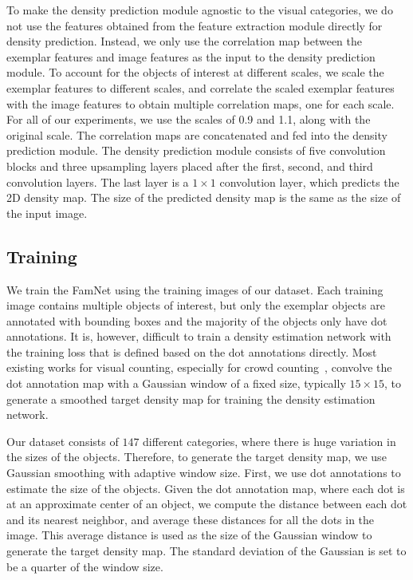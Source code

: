 To make the density prediction module agnostic to the visual categories, we do not use the features obtained from the feature extraction module directly for  density prediction. Instead, we only use the correlation map between the exemplar features and image features as the input to the density prediction module. To account for the objects of interest at different scales, we scale the exemplar features to different scales, and correlate the scaled exemplar features with the image features to obtain multiple correlation maps, one for each scale. For all of our experiments, we use the scales of 0.9 and 1.1, along with the original scale. The correlation maps are concatenated and fed into the density prediction module. The density prediction module consists of five convolution blocks and three upsampling layers placed after the first, second, and third convolution layers. The last layer is a $1{\times}1$ convolution layer, which predicts the 2D density map. The size of the predicted density map is the same as the size of the input image. 

\subsection{Training}

We train the FamNet using the training images of our dataset. Each training image contains multiple objects of interest, but only the exemplar objects are annotated with bounding boxes and the majority of the objects only have dot annotations. It is, however, difficult to train a density estimation network with the training loss that is defined based on the dot annotations directly. Most existing works for visual counting, especially for crowd counting~\cite{zhang2016single}, convolve the dot annotation map with a Gaussian window of a fixed size, typically $15{\times}15$, to generate a smoothed target density map for training the density estimation network. 

Our dataset consists of $147$ different categories, where there is huge variation in the sizes of the objects. Therefore, to generate the target density map, we use Gaussian smoothing with adaptive window size. First, we use dot annotations to estimate the size of the objects. Given the dot annotation map, where each dot is at an approximate center of an object, we compute the distance between each dot and its nearest neighbor, and average these distances for all the dots in the image. This average distance is used as the size of the Gaussian window to generate the target density map. The standard deviation of the Gaussian is set to be a quarter of the window size. 

